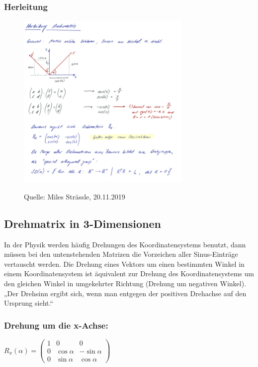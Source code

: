 \subsubsection{Herleitung}
\begin{figure}[H] 
\centering
    {\includegraphics[width=0.75\textwidth]{images/herldrehmat.png}}
    \caption{Quelle: Miles Strässle, 20.11.2019}    
\end{figure}

\subsection{Drehmatrix in 3-Dimensionen}
In der Physik werden häufig Drehungen des Koordinatensystems benutzt, dann müssen bei den untenstehenden Matrizen die Vorzeichen aller Sinus-Einträge vertauscht werden. Die Drehung eines Vektors um einen bestimmten Winkel in einem Koordinatensystem ist äquivalent zur Drehung des Koordinatensystems um den gleichen Winkel in umgekehrter Richtung (Drehung um negativen Winkel). 
\vspace{0.5cm}
„Der Drehsinn ergibt sich, wenn man entgegen der positiven Drehachse auf den Ursprung sieht.“

\subsubsection{Drehung um die x-Achse:}
$R_x(\alpha) = \begin{pmatrix}
1 &   0         & 0           \\
0 & \cos \alpha & -\sin \alpha \\
0 & \sin \alpha &  \cos \alpha
\end{pmatrix}$
